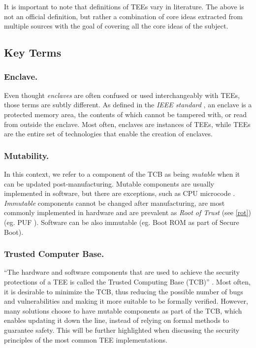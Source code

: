 \documentclass[runningheads,a4paper]{uwsese}
\begin{document}
It is important to note that definitions of TEEs vary in literature. The above is
not an official definition, but rather a combination of core ideas extracted from
multiple sources with the goal of covering all the core ideas of the subject.

\subsection{Key Terms}

\subsubsection{Enclave.}

Even thought \emph{enclaves} are often confused or used interchangeably with
TEEs, those terms are subtly different. As defined in the \emph{IEEE standard}
\cite{tee_ieee_standard}, an enclave is a protected memory area, the contents
of which cannot be tampered with, or read from outside the enclave. Most often,
enclaves are instances of TEEs, while TEEs are the entire set of technologies
that enable the creation of enclaves.

\subsubsection{Mutability.}

In this context, we refer to a component of the TCB as being \emph{mutable}
when it can be updated post-manufacturing. Mutable components are usually
implemented in software, but there are exceptions, such as CPU microcode
\cite{microcode_update}. \emph{Immutable} components cannot be changed after
manufacturing, are most commonly implemented in hardware and are prevalent as
\emph{Root of Trust} (see \ref{rot}) (eg. PUF \cite{tee_base_article}).
Software can be also immutable (eg. Boot ROM as part of Secure Boot).

\subsubsection{Trusted Computer Base.}

``The hardware and software components that are used to achieve the security
protections of a TEE is called the Trusted Computing Base (TCB)''
\cite{tee_hw_sup}. Most often, it is desirable to minimize the TCB, thus
reducing the possible number of bugs and vulnerabilities and making it more
suitable to be formally verified. However, many solutions choose to have
mutable components as part of the TCB, which enables updating it down the line,
instead of relying on formal methods to guarantee safety. This will be further
highlighted when discussing the security principles of the most common TEE
implementations.
\end{document}
